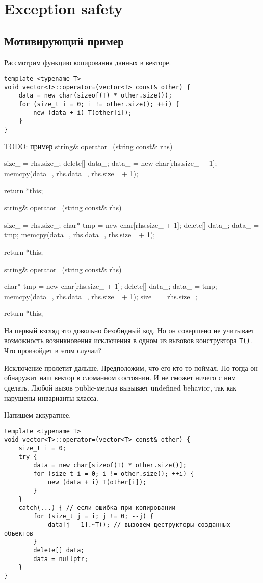 \section{Exception safety}
\subsection{Мотивирующий пример}
Рассмотрим функцию копирования данных в векторе.
\begin{verbatim}
template <typename T>
void vector<T>::operator=(vector<T> const& other) {
    data = new char(sizeof(T) * other.size());
    for (size_t i = 0; i != other.size(); ++i) {
        new (data + i) T(other[i]);
    }
}
\end{verbatim}

TODO: пример
string& operator=(string const& rhs)
{
    size_ = rhs.size_;
    delete[] data_;
    data_ = new char[rhs.size_ + 1];
    memcpy(data_, rhs.data_, rhs.size_ + 1);

    return *this;
}

string& operator=(string const& rhs)
{
    size_ = rhs.size_;
    char* tmp = new char[rhs.size_ + 1];
    delete[] data_;
    data_ = tmp;
    memcpy(data_, rhs.data_, rhs.size_ + 1);

    return *this;
}

string& operator=(string const& rhs)
{
    char* tmp = new char[rhs.size_ + 1];
    delete[] data_;
    data_ = tmp;
    memcpy(data_, rhs.data_, rhs.size_ + 1);
    size_ = rhs.size_;

    return *this;
}

На первый взгляд это довольно безобидный код. Но он совершено не учитывает возможность возникновения исключения в одном из вызовов конструктора \texttt{T()}. Что произойдет в этом случаи?

Исключение пролетит дальше. Предположим, что его кто-то поймал. Но тогда он обнаружит наш вектор в сломанном состоянии. И не сможет ничего с ним сделать. Любой вызов public-метода вызывает undefined behavior, так как нарушены инварианты класса.

Напишем аккуратнее.
\begin{verbatim}
template <typename T>
void vector<T>::operator=(vector<T> const& other) {
    size_t i = 0;
    try {
        data = new char[sizeof(T) * other.size()];
        for (size_t i = 0; i != other.size(); ++i) {
            new (data + i) T(other[i]);
        }
    }
    catch(...) { // если ошибка при копировании
        for (size_t j = i; j != 0; --j) {
            data[j - 1].~T(); // вызовем деструкторы созданных объектов
        }
        delete[] data;
        data = nullptr;
    }
}
\end{verbatim}

